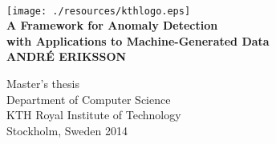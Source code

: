 \begin{titlepage}
\begin{center}

\quad\\[1.4cm]
\texttt{[image: ./resources/kthlogo.eps]}~\\[2.5cm]

{ \LARGE \bfseries A Framework for Anomaly Detection \\ with Applications to Machine-Generated Data}\\[3.0cm]

{\large \bfseries ANDRÉ ERIKSSON}\\[1.8cm]

\vfill

{ Master's thesis\\Department of Computer Science\\ KTH Royal Institute of Technology\\ Stockholm, Sweden 2014}

\end{center}
\end{titlepage}
